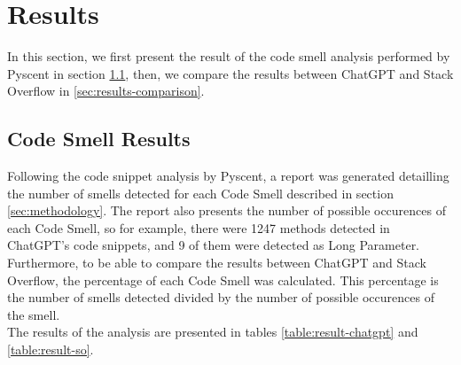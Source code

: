 \section{Results}
\label{sec:results}
In this section, we first present the result of the code smell analysis performed by Pyscent in section \ref{sec:results-code-smell}, then, we compare the results between ChatGPT and Stack Overflow in \ref{sec:results-comparison}. \\

\subsection{Code Smell Results}
\label{sec:results-code-smell}
Following the code snippet analysis by Pyscent, a report was generated detailling the number of smells detected for each Code Smell described in section \ref{sec:methodology}. The report also presents the number of possible occurences of each Code Smell, so for example, there were 1247 methods detected in ChatGPT's code snippets, and 9 of them were detected as Long Parameter. \\

Furthermore, to be able to compare the results between ChatGPT and Stack Overflow, the percentage of each Code Smell was calculated. This percentage is the number of smells detected divided by the number of possible occurences of the smell. \\

The results of the analysis are presented in tables \ref{table:result-chatgpt} and \ref{table:result-so}. \\

